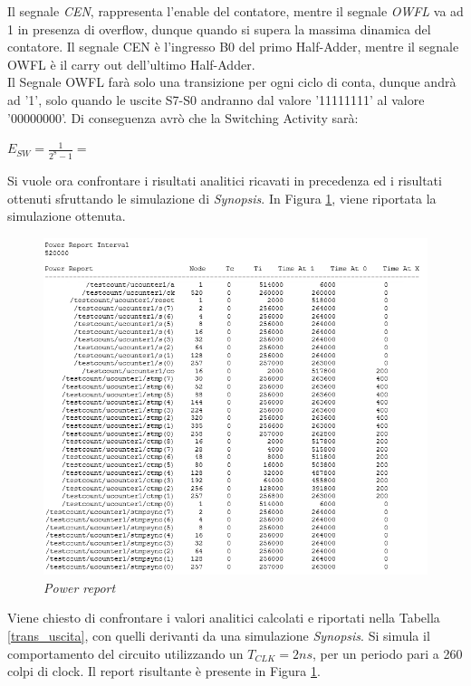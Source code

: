 Il segnale \textit{CEN}, rappresenta l'enable del contatore, mentre il segnale \textit{OWFL} va ad 1 in presenza di overflow, dunque quando si supera la massima dinamica del contatore. Il segnale CEN è l'ingresso B0 del primo Half-Adder, mentre il segnale OWFL è il carry out dell'ultimo Half-Adder. \\
Il Segnale OWFL farà solo una transizione per ogni ciclo di conta, dunque andrà ad '1', solo quando le uscite S7-S0 andranno dal valore '11111111' al valore '00000000'. Di conseguenza avrò che la Switching Activity sarà:
\begin{center}
	$E_{SW}=\frac{1}{2^{8}-1}=$
\end{center}
Si vuole ora confrontare i risultati analitici ricavati in precedenza ed i risultati ottenuti sfruttando le simulazione di \textit{Synopsis}. In Figura \ref{report_counter}, viene riportata la simulazione ottenuta.\\
\begin{figure}[!htb]
	\centering
	\includegraphics[scale=0.6]{immagini/report_counter}
	\caption{\textit{Power report}}
	\label{report_counter}
\end{figure}
Viene chiesto di confrontare i valori analitici calcolati e riportati nella Tabella \ref{trans_uscita}, con quelli derivanti da una simulazione \textit{Synopsis}. Si simula il comportamento del circuito utilizzando un $T_{CLK}=2 ns$, per un periodo pari a 260 colpi di clock. Il report risultante è presente in Figura \ref{report_counter}.
